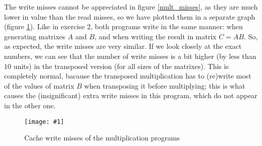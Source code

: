 \documentclass{article}
\newcommand{\myFigure}[4]{%
    \begin{figure}[!ht]
        \texttt{[image: \#1]}
        \centering
        \caption{#2}
        \label{#3}
    \end{figure}
}
\begin{document}
The write misses cannot be appreciated in figure \ref{mult_misses}, as they are much lower in value than the read misses, so we have plotted them in a separate graph (figure \ref{mult_misses_write}). Like in exercise 2, both programs write in the same manner: when generating matrixes $A$ and $B$, and when writing the result in matrix $C=AB$. So, as expected, the write misses are very similar. If we look closely at the exact numbers, we can see that the number of write misses is a bit higher (by less than $10$ units) in the transposed version (for all sizes of the matrixes). This is completely normal, bacause the transposed multiplication has to (re)write most of the values of matrix $B$ when transposing it before multiplying; this is what causes the (insignificant) extra write misses in this program, which do not appear in the other one. 

\myFigure{../material_P3/out3/mv_att2/mult_cache_write.png}{Cache write misses of the multiplication programs}{mult_misses_write}{0.4}
\end{document}
